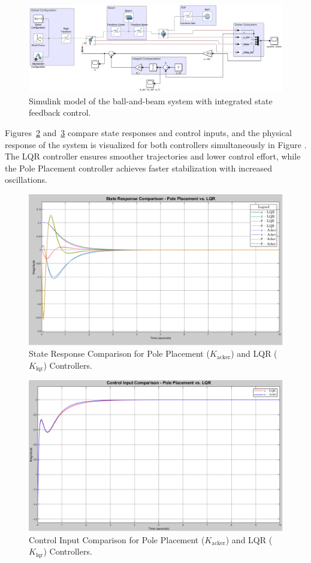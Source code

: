 \documentclass[conference]{IEEEtran}
\begin{document}
\begin{figure}[H]
    \centering
    \includegraphics[width=\linewidth]{figures/simulink_model.png}
    \caption{Simulink model of the ball-and-beam system with integrated state feedback control.}
    \label{fig:simulink_model}
\end{figure}

Figures~\ref{fig:state_compare} and~\ref{fig:control_input_compare} compare state responses and control inputs, and the physical response of the system is visualized for both controllers simultaneously in Figure . The LQR controller ensures smoother trajectories and lower control effort, while the Pole Placement controller achieves faster stabilization with increased oscillations.

\begin{figure}[H]
    \centering
    \includegraphics[width=0.6\linewidth]{figures/states_compare_scope.png}
    \caption{State Response Comparison for Pole Placement (\(K_{\text{acker}}\)) and LQR (\(K_{\text{lqr}}\)) Controllers.}
    \label{fig:state_compare}
\end{figure}

\begin{figure}[H]
    \centering
    \includegraphics[width=0.6\linewidth]{figures/control_input_compare.png}
    \caption{Control Input Comparison for Pole Placement (\(K_{\text{acker}}\)) and LQR (\(K_{\text{lqr}}\)) Controllers.}
    \label{fig:control_input_compare}
\end{figure}
\end{document}
